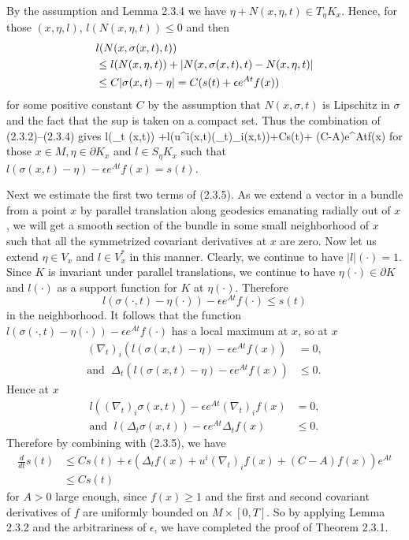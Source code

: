 By the assumption and Lemma 2.3.4 we have $\eta+N(x,\eta,t)\in
T_\eta K_x$. Hence, for those $(x,\eta,l)$, $l(N(x,\eta,t))\leq 0$
and then
\begin{align}
& l(N(x,\sigma(x,t),t))\\
&  \leq l(N(x,\eta,t))+|N(x,\sigma(x,t),t)-N(x,\eta,t)| \nonumber\\
&  \leq C|\sigma(x,t)-\eta|=C(s(t)+\epsilon e^{At}f(x)) \nonumber
\end{align} %
for some positive constant $C$ by the assumption that
$N(x,\sigma,t)$ is Lipschitz in $\sigma$ and the fact that the sup
is taken on a compact set. Thus the combination of
(2.3.2)--(2.3.4) gives \be {}\leq l(\Delta_t
\sigma(x,t)) +l(u^i(x,t)(\nabla_t)_i\sigma(x,t))+Cs(t)+\epsilon
(C-A)e^{At}f(x)
\ee for those $x\in M, \eta \in \partial K_x$ and $l\in  S_\eta
K_x$ such that $ l(\sigma(x,t)-\eta)-\epsilon e^{At}f(x)=s(t)$.

Next we estimate the first two terms of (2.3.5). As we extend a
vector in a bundle from a point $x$ by parallel translation along
geodesics emanating radially out of $x$, we will get a smooth
section of the bundle in some small neighborhood of $x$ such that
all the symmetrized covariant derivatives at $x$ are zero. Now let
us extend $\eta\in V_x$ and $l\in V^*_x$ in this manner.  Clearly,
we continue to have $|l|(\cdot)=1$. Since $K$ is invariant under
parallel translations, we continue to have $\eta (\cdot)\in
\partial K$ and $l(\cdot)$ as a support function for $K$ at $\eta
(\cdot)$. Therefore
$$
l(\sigma(\cdot,t)-\eta(\cdot))-\epsilon e^{At}f(\cdot)\leq s(t)
$$
in the neighborhood. It follows that the function
$l(\sigma(\cdot,t)-\eta(\cdot))-\epsilon e^{At}f(\cdot)$ has a
local maximum at $x$, so at $x$
\begin{align*}
(\nabla _t)_i(l(\sigma(x,t)-\eta)-\epsilon e^{At}f(x))&=0,\\
\text{and }\; \Delta_t(l(\sigma(x,t)-\eta)-\epsilon e^{At}f(x))&
\leq 0.
\end{align*}
Hence at $x$
\begin{align*}
l((\nabla _t)_i\sigma(x,t))-\epsilon e^{At}(\nabla_t)_if(x)&=0,\\
\text{and }\; l(\Delta_t \sigma(x,t))-\epsilon e^{At}\Delta_t
f(x)&\leq 0.
\end{align*}
Therefore by combining with (2.3.5), we have
\begin{align*}
\frac{d}{dt}s(t)&  \leq Cs(t)+\epsilon
(\Delta_tf(x)+u^i(\nabla_t)_if(x)+(C-A)f(x))e^{At} \\
&  \leq Cs(t)
\end{align*}
for $A>0$ large enough, since $f(x)\geq 1$ and the first and
second covariant derivatives of $f$ are uniformly bounded on
$M\times[0,T]$. So by applying Lemma 2.3.2 and the arbitrariness
of $\epsilon$, we have completed the proof of Theorem 2.3.1.
\endproof

